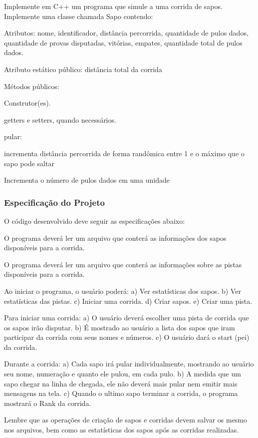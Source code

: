 Implemente em C++ um programa que simule a uma corrida de sapos. Implemente uma classe chamada Sapo contendo\+:
\begin{DoxyItemize}
\item Atributos\+: nome, identificador, distância percorrida, quantidade de pulos dados, quantidade de provas disputadas, vitórias, empates, quantidade total de pulos dados.
\item Atributo estático público\+: distância total da corrida
\item Métodos públicos\+:
\begin{DoxyItemize}
\item Construtor(es).
\item getters e setters, quando necessários.
\item pular\+:
\begin{DoxyItemize}
\item incrementa distância percorrida de forma randômica entre 1 e o máximo que o sapo pode saltar
\item Incrementa o número de pulos dados em uma unidade \subsubsection*{Especificação do Projeto}
\end{DoxyItemize}

O código desenvolvido deve seguir as especificações abaixo\+:
\end{DoxyItemize}
\end{DoxyItemize}
\begin{DoxyEnumerate}
\item O programa deverá ler um arquivo que conterá as informações dos sapos disponíveis para a corrida.
\item O programa deverá ler um arquivo que conterá as informações sobre as pistas disponíveis para a corrida.
\item Ao iniciar o programa, o usuário poderá\+: a) Ver estatísticas dos sapos. b) Ver estatísticas das pistas. c) Iniciar uma corrida. d) Criar sapos. e) Criar uma pista.
\item Para iniciar uma corrida\+: a) O usuário deverá escolher uma pista de corrida que os sapos irão disputar. b) É mostrado ao usuário a lista dos sapos que iram participar da corrida com seus nomes e números. c) O usuário dará o start (pei) da corrida.
\item Durante a corrida\+: a) Cada sapo irá pular individualmente, mostrando ao usuário seu nome, numeração e quanto ele pulou, em cada pulo. b) A medida que um sapo chegar na linha de chegada, ele não deverá mais pular nem emitir mais mensagens na tela. c) Quando o ultimo sapo terminar a corrida, o programa mostrará o Rank da corrida.
\item Lembre que as operações de criação de sapos e corridas devem salvar os mesmo nos arquivos, bem como as estatísticas dos sapos após as corridas realizadas.
\end{DoxyEnumerate}

